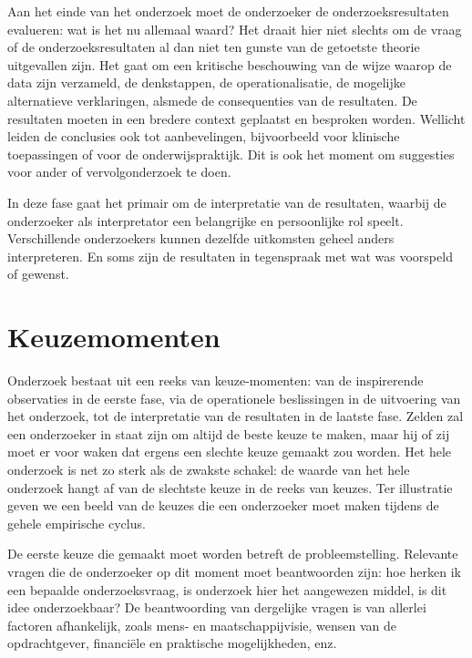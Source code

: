 \documentclass[
]{book}
\begin{document}
Aan het einde van het onderzoek moet de onderzoeker de
onderzoeksresultaten evalueren: wat is het nu allemaal waard? Het draait
hier niet slechts om de vraag of de onderzoeksresultaten al dan niet ten
gunste van de getoetste theorie uitgevallen zijn. Het gaat om een
kritische beschouwing van de wijze waarop de data zijn verzameld, de
denkstappen, de operationalisatie, de mogelijke alternatieve
verklaringen, alsmede de consequenties van de resultaten. De resultaten
moeten in een bredere context geplaatst en besproken worden. Wellicht
leiden de conclusies ook tot aanbevelingen, bijvoorbeeld voor klinische
toepassingen of voor de onderwijspraktijk. Dit is ook het moment om
suggesties voor ander of vervolgonderzoek te doen.

In deze fase gaat het primair om de interpretatie van de resultaten,
waarbij de onderzoeker als interpretator een belangrijke en persoonlijke
rol speelt. Verschillende onderzoekers kunnen dezelfde uitkomsten geheel
anders interpreteren. En soms zijn de resultaten in tegenspraak met wat
was voorspeld of gewenst.

\section{Keuzemomenten}\label{sec:keuzemomenten}

Onderzoek bestaat uit een reeks van keuze-momenten: van de inspirerende
observaties in de eerste fase, via de operationele beslissingen in de
uitvoering van het onderzoek, tot de interpretatie van de resultaten in
de laatste fase. Zelden zal een onderzoeker in staat zijn om altijd de
beste keuze te maken, maar hij of zij moet er voor waken dat ergens een
slechte keuze gemaakt zou worden. Het hele onderzoek is net zo sterk als
de zwakste schakel: de waarde van het hele onderzoek hangt af van de
slechtste keuze in de reeks van keuzes. Ter illustratie geven we een
beeld van de keuzes die een onderzoeker moet maken tijdens de gehele
empirische cyclus.

De eerste keuze die gemaakt moet worden betreft de probleemstelling.
Relevante vragen die de onderzoeker op dit moment moet beantwoorden
zijn: hoe herken ik een bepaalde onderzoeksvraag, is onderzoek hier het
aangewezen middel, is dit idee onderzoekbaar? De beantwoording van
dergelijke vragen is van allerlei factoren afhankelijk, zoals mens- en
maatschappijvisie, wensen van de opdrachtgever, financiële en praktische
mogelijkheden, enz.
\end{document}
